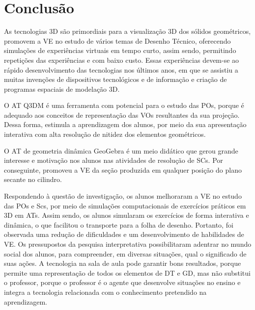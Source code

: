 \section{Conclusão}\label{sec-conclusão}

As tecnologias 3D são primordiais para a visualização 3D dos sólidos
geométricos, promovem a VE no estudo de vários temas de Desenho Técnico,
oferecendo simulações de experiências virtuais em tempo curto, assim
sendo, permitindo repetições das experiências e com baixo custo. Essas
experiências devem-se ao rápido desenvolvimento das tecnologias nos
últimos anos, em que se assistiu a muitas invenções de dispositivos
tecnológicos e de informação e criação de programas espaciais de
modelação 3D.

O AT Q3DM é uma ferramenta com potencial para o estudo das POs, porque é
adequado aos conceitos de representação das VOs resultantes da sua
projeção. Dessa forma, estimula a aprendizagem dos alunos, por meio da
sua apresentação interativa com alta resolução de nitidez dos elementos
geométricos.

O AT de geometria dinâmica GeoGebra é um meio didático que gerou grande
interesse e motivação nos alunos nas atividades de resolução de SCs. Por
conseguinte, promoveu a VE da seção produzida em qualquer posição do
plano secante no cilindro.

Respondendo à questão de investigação, os alunos melhoraram a VE no
estudo das POs e Scs, por meio de simulações computacionais de
exercícios práticos em 3D em ATs. Assim sendo, os alunos simularam os
exercícios de forma interativa e dinâmica, o que facilitou o transporte
para a folha de desenho. Portanto, foi observada uma redução de
dificuldades e um desenvolvimento de habilidades de VE. Os pressupostos
da pesquisa interpretativa possibilitaram adentrar no mundo social dos
alunos, para compreender, em diversas situações, qual o significado de
suas ações. A tecnologia na sala de aula pode garantir bons resultados,
porque permite uma representação de todos os elementos de DT e GD, mas
não substitui o professor, porque o professor é o agente que desenvolve
situações no ensino e integra a tecnologia relacionada com o
conhecimento pretendido na aprendizagem.


